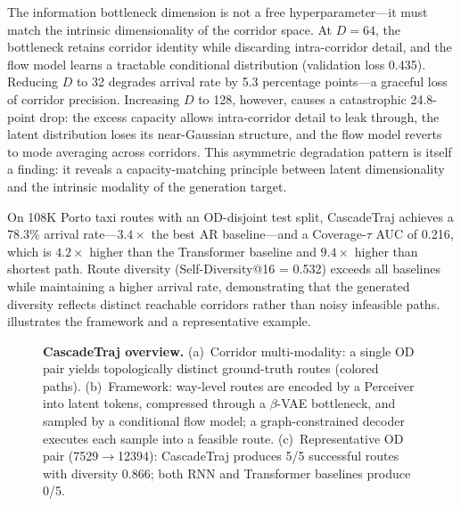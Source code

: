 The information bottleneck dimension is not a free hyperparameter---it must match the intrinsic dimensionality of the corridor space.
At $D\!=\!64$, the bottleneck retains corridor identity while discarding intra-corridor detail, and the flow model learns a tractable conditional distribution (validation loss 0.435).
Reducing $D$ to 32 degrades arrival rate by 5.3 percentage points---a graceful loss of corridor precision.
Increasing $D$ to 128, however, causes a catastrophic 24.8-point drop: the excess capacity allows intra-corridor detail to leak through, the latent distribution loses its near-Gaussian structure, and the flow model reverts to mode averaging across corridors.
This asymmetric degradation pattern is itself a finding: it reveals a capacity-matching principle between latent dimensionality and the intrinsic modality of the generation target.

On 108K Porto taxi routes with an OD-disjoint test split, CascadeTraj achieves a 78.3\% arrival rate---$3.4\times$ the best AR baseline---and a Coverage-$\tau$ AUC of 0.216, which is $4.2\times$ higher than the Transformer baseline and $9.4\times$ higher than shortest path.
Route diversity (Self-Diversity@16 = 0.532) exceeds all baselines while maintaining a higher arrival rate, demonstrating that the generated diversity reflects distinct reachable corridors rather than noisy infeasible paths.
 illustrates the framework and a representative example.

\begin{figure}[t]
  \centering
  \caption{%
    \textbf{CascadeTraj overview.}
    (a)~Corridor multi-modality: a single OD pair yields topologically distinct ground-truth routes (colored paths).
    (b)~Framework: way-level routes are encoded by a Perceiver into latent tokens, compressed through a $\beta$-VAE bottleneck, and sampled by a conditional flow model; a graph-constrained decoder executes each sample into a feasible route.
    (c)~Representative OD pair (7529$\to$12394): CascadeTraj produces 5/5 successful routes with diversity 0.866; both RNN and Transformer baselines produce 0/5.
  }
  \label{fig:framework}
\end{figure}
